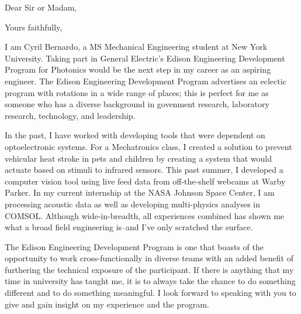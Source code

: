 \documentclass[11pt,a4paper,sans]{moderncv}        %
\newcommand{\CompanyName}{General Electric}
\newcommand{\ProgramName}{Edison Engineering Development Program}
\newcommand{\PositionName}{Photonics}
\begin{document}
\recipient{\CompanyName{}}{}
\date{\today}
\opening{Dear Sir or Madam,}
\closing{Yours faithfully,}
\makelettertitle

I am Cyril Bernardo, a MS Mechanical Engineering student at New York University. Taking part in \CompanyName{}'s \ProgramName{} for \PositionName{} would be the next step in my career as an aspiring engineer. The \ProgramName{} advertises an eclectic program with rotations in a wide range of places; this is perfect for me as someone who has a diverse background in govenment research, laboratory research, technology, and leadership.

In the past, I have worked with developing tools that were dependent on optoelectronic systems. For a Mechatronics class, I created a solution to prevent vehicular heat stroke in pets and children by creating a system that would actuate based on stimuli to infrared sensors. This past summer, I developed a computer vision tool using live feed data from off-the-shelf webcams at Warby Parker. In my current internship at the NASA Johnson Space Center, I am processing acoustic data as well as developing multi-physics analyses in COMSOL. Although wide-in-breadth, all experiences combined has shown me what a broad field engineering is--and I've only scratched the surface.

The \ProgramName{} is one that boasts of the opportunity to work cross-functionally in diverse teams with an added benefit of furthering the technical exposure of the participant. If there is anything that my time in university has taught me, it is to always take the chance to do something different and to do something meaningful. I look forward to speaking with you to give and gain insight on my experience and the program.


\makeletterclosing
\end{document}
